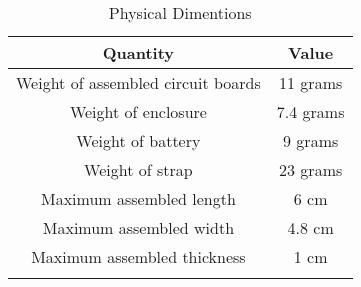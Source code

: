 \begin{longtable}{ c | c }
\toprule
Quantity & Value \\
\midrule
Weight of assembled circuit boards & 11 grams \\
Weight of enclosure & 7.4 grams \\
Weight of battery & 9 grams \\
Weight of strap & 23 grams \\
Maximum assembled length & 6 cm \\
Maximum assembled width & 4.8 cm \\
Maximum assembled thickness & 1 cm \\
\bottomrule

\caption{Physical Dimentions}
\label{table:physical-dimentions}
\end{longtable}

